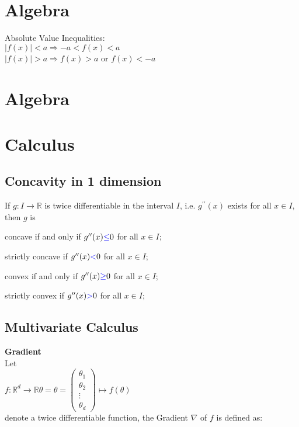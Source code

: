 \section{Algebra}
Absolute Value Inequalities:\\
$ |f(x)| < a  \Rightarrow  -a < f(x) < a$\\ 
$|f(x)| > a  \Rightarrow f(x) > a$ or $f(x) < -a$\\

\section{Algebra}
\section{Calculus}
\subsection{Concavity in 1 dimension}
If $g:I \to \mathbb {R}$ is twice differentiable in the interval $I$, i.e. $g^{\prime \prime }(x)$ exists for all $x \in I$, then $g$  is

concave if and only if $g^{\prime \prime }(x) {\color{blue}{\leq }}  0$ for all $x \in I$;

strictly concave if $g^{\prime \prime }(x) {\color{blue}{<}}  0$ for all $x \in I$;

convex if and only if $g^{\prime \prime }(x) {\color{blue}{\geq }}  0$ for all $x \in I$;

strictly convex if $g^{\prime \prime }(x) {\color{blue}{>}}  0$ for all $x \in I$;

\subsection{Multivariate Calculus}
\textbf{Gradient}\\
Let\\
$f: \mathbb {R}^ d \longrightarrow \mathbb {R} \theta = \displaystyle \theta =\begin{pmatrix} \theta _1\\ \theta _2\\ \vdots \\ \theta _ d\end{pmatrix} \displaystyle \mapsto \displaystyle f(\theta )$\\
denote a twice differentiable function, the Gradient $\nabla$ of $f$ is defined as:

